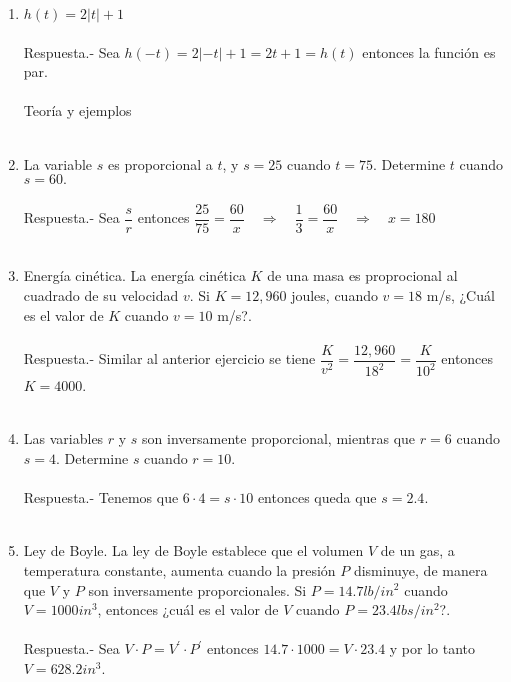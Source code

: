 \begin{enumerate}
    \item $h(t)=2|t|+1$\\\\
	Respuesta.-\; Sea $h(-t)=2|-t| + 1 = 2t + 1 = h(t)$ entonces la función es par.\\\\

    Teoría y ejemplos\\\\

    \item La variable $s$ es proporcional a $t$, y $s=25$ cuando $t=75$. Determine $t$ cuando $s=60.$\\\\
	Respuesta.-\; Sea $\dfrac{s}{r}$ entonces $\dfrac{25}{75}=\dfrac{60}{x} \quad \Rightarrow \quad \dfrac{1}{3} = \dfrac{60}{x} \quad \Rightarrow \quad x=180$\\\\ 

    \item Energía cinética. La energía cinética $K$ de una masa es proprocional al cuadrado de su velocidad $v$. Si $K=12,960$ joules, cuando $v=18$ m/s, ¿Cuál es el valor de $K$ cuando $v=10$ m/s?.\\\\
	Respuesta.-\; Similar al anterior ejercicio se tiene $\dfrac{K}{v^2} = \dfrac{12,960}{18^2} = \dfrac{K}{10^2}$ entonces $K=4000$.\\\\

    \item Las variables $r$ y $s$ son inversamente proporcional, mientras que $r=6$ cuando $s=4$. Determine $s$ cuando $r=10$.\\\\
	Respuesta.-\; Tenemos que $6\cdot 4 = s \cdot 10$ entonces queda que $s = 2.4$.\\\\

    \item Ley de Boyle. La ley de Boyle establece que el volumen $V$ de un gas, a temperatura constante, aumenta cuando la presión $P$ disminuye, de manera que $V$ y $P$ son inversamente proporcionales. Si $P = 14.7 lb/in^2$ cuando $V = 1000 in^3$, entonces ¿cuál es el valor de $V$ cuando $P = 23.4 lbs/in^2$?.\\\\
	Respuesta.-\; Sea $V\cdot P = V^{'} \cdot P^{'}$ entonces $14.7 \cdot 1000 = V \cdot 23.4$ y por lo tanto $V=628.2 in^3$.\\\\


\end{enumerate}
